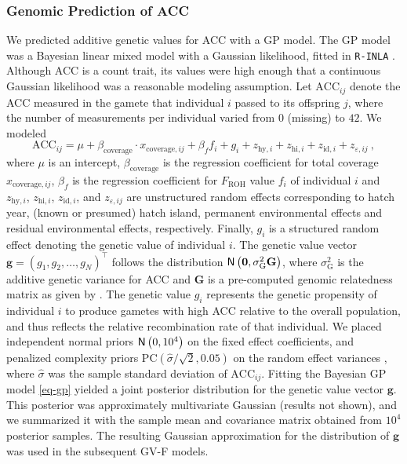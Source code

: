 \documentclass[dvipsnames]{article}
\begin{document}
\subsubsection*{Genomic Prediction of ACC}

We predicted additive genetic values for ACC with a GP model.
The GP model was a Bayesian linear mixed model with a Gaussian likelihood, fitted in \texttt{R-INLA} \citep{rue2009approximate}.
Although ACC is a count trait, its values were high enough that a continuous Gaussian likelihood was a reasonable modeling assumption.
Let $\mathrm{ACC}_{ij}$ denote the ACC measured in the gamete that individual $i$ passed to its offspring $j$, where the number of measurements per individual varied from $0$ (missing) to $42$.
We modeled
\begin{equation}
    \mathrm{ACC}_{ij} = \mu + \beta_\text{coverage} \cdot x_{\text{coverage},ij} + \beta_f f_i +  g_i + z_{\text{hy},i} + z_{\text{hi},i} + z_{\text{id},i} + z_{\varepsilon,ij}\ ,
    \label{eq-gp}
\end{equation}
where $\mu$ is an intercept, $\beta_\text{coverage}$ is the regression coefficient for total coverage $x_{\text{coverage},ij}$, $\beta_f$ is the regression coefficient for $F_\text{ROH}$ value $f_i$ of individual $i$ and $z_{\text{hy},i}$, $z_{\text{hi},i}$, $z_{\text{id},i}$, and $z_{\varepsilon,ij}$ are unstructured random effects corresponding to hatch year, (known or presumed) hatch island, permanent environmental effects and residual environmental effects, respectively.
Finally, $g_i$ is a structured random effect denoting the genetic value of individual $i$.
The genetic value vector $\bm g = \left(g_1, g_2, \ldots, g_N\right)^\top$ follows the distribution $\mathsf{N}\left(\bm{0}, \sigma_{\text{G}}^2 \mathbf{G}\right)$, where $\sigma_{\text{G}}^2$ is the additive genetic variance for ACC and $\mathbf{G}$ is a pre-computed genomic relatedness matrix as given by \citet{vanraden2008efficient}. %
The genetic value $g_i$ represents the genetic propensity of individual $i$ to produce gametes with high ACC relative to the overall population, and thus reflects the relative recombination rate of that individual.
We placed independent normal priors $\mathsf{N}\left(0, 10^4\right)$ on the fixed effect coefficients, and penalized complexity priors $\mathrm{PC}\left(\hat \sigma / \sqrt{2}, 0.05\right)$ on the random effect variances \citep{simpson2017penalising}, where $\hat\sigma$ was the sample standard deviation of $\mathrm{ACC}_{ij}$. %
Fitting the Bayesian GP model \eqref{eq-gp} yielded a joint posterior distribution for the genetic value vector $\bm g$.
This posterior was approximately multivariate Gaussian (results not shown), and we summarized it with the sample mean and covariance matrix obtained from $10^4$ posterior samples.
The resulting Gaussian approximation for the distribution of $\bm g$ was used in the subsequent GV-F models.
\end{document}
